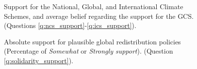 \begin{figure}[h!]
    \caption[Support for the NCS, GCS, ICS, and belief of support for GCS]{Support for the National, Global, and International Climate Schemes, and average belief regarding the support for the GCS. (Questions \ref{q:ncs_support}-\ref{q:ics_support}).
    }\label{fig:ncs_gcs_ics}
\end{figure} 

\begin{figure}[h!]
    \caption[Absolute support for plausible global redistribution policies]{Absolute support for plausible global redistribution policies (Percentage of \textit{Somewhat} or \textit{Strongly support}). (Question \ref{q:solidarity_support}).
    }\label{fig:solidarity_support_positive}
\end{figure}

